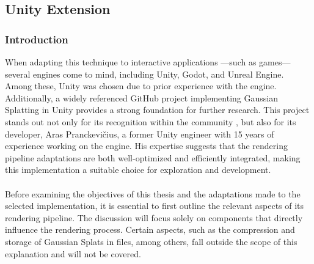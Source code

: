 \documentclass[12pt]{article}
\begin{document}
\subsection{Unity Extension}
\label{sec:pipeline_overview}
\subsubsection{Introduction}
When adapting this technique to interactive applications —such as games—several engines come to mind, including Unity, Godot, and Unreal Engine. Among these, Unity was chosen due to prior experience with the engine. Additionally, a widely referenced GitHub project \cite{Aras} implementing Gaussian Splatting in Unity provides a strong foundation for further research. This project stands out not only for its recognition within the community \cite{ArasRecc1,ArasRecc2}, but also for its developer, Aras Pranckevičius, a former Unity engineer with 15 years of experience working on the engine. His expertise suggests that the rendering pipeline adaptations are both well-optimized and efficiently integrated, making this implementation a suitable choice for exploration and development.
\\\\
Before examining the objectives of this thesis and the adaptations made to the selected implementation, it is essential to first outline the relevant aspects of its rendering pipeline. The discussion will focus solely on components that directly influence the rendering process. Certain aspects, such as the compression and storage of Gaussian Splats in files, among others, fall outside the scope of this explanation and will not be covered.
\end{document}
